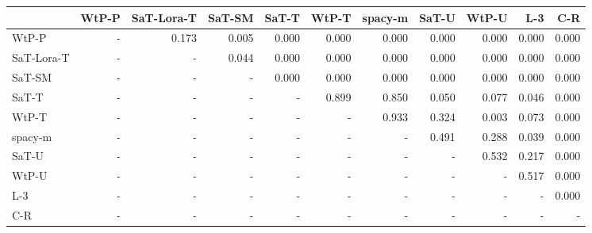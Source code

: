 \begin{tabular}{lrrrrrrrrrr}
\toprule
 & WtP-P & SaT-Lora-T & SaT-SM & SaT-T & WtP-T & spacy-m & SaT-U & WtP-U & L-3 & C-R \\
\midrule
WtP-P & - & 0.173 & 0.005 & 0.000 & 0.000 & 0.000 & 0.000 & 0.000 & 0.000 & 0.000 \\
SaT-Lora-T & - & - & 0.044 & 0.000 & 0.000 & 0.000 & 0.000 & 0.000 & 0.000 & 0.000 \\
SaT-SM & - & - & - & 0.000 & 0.000 & 0.000 & 0.000 & 0.000 & 0.000 & 0.000 \\
SaT-T & - & - & - & - & 0.899 & 0.850 & 0.050 & 0.077 & 0.046 & 0.000 \\
WtP-T & - & - & - & - & - & 0.933 & 0.324 & 0.003 & 0.073 & 0.000 \\
spacy-m & - & - & - & - & - & - & 0.491 & 0.288 & 0.039 & 0.000 \\
SaT-U & - & - & - & - & - & - & - & 0.532 & 0.217 & 0.000 \\
WtP-U & - & - & - & - & - & - & - & - & 0.517 & 0.000 \\
L-3 & - & - & - & - & - & - & - & - & - & 0.000 \\
C-R & - & - & - & - & - & - & - & - & - & - \\
\bottomrule
\end{tabular}

